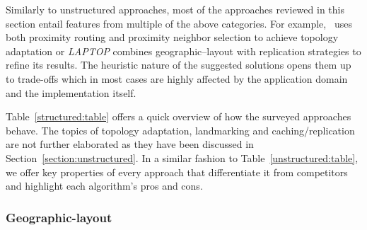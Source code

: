 Similarly to unstructured approaches, most of the approaches 
reviewed in this section entail features from multiple of the above categories. 
For example, \cite{KLKP2008}~uses both proximity routing 
and proximity neighbor selection to achieve topology adaptation 
or \emph{LAPTOP} combines geographic--layout with
replication strategies to refine its results. 
The heuristic nature of the suggested solutions opens them up 
to trade-offs which in most cases are 
highly affected by the application domain and the implementation itself.

Table~\ref{structured:table} offers a quick overview of how the surveyed 
approaches behave.  
The topics of topology adaptation, landmarking and caching/replication
are not further elaborated as they have been discussed 
in Section~\ref{section:unstructured}.
In a similar fashion to Table~\ref{unstructured:table}, we offer 
key properties of every approach 
that differentiate it from competitors and
highlight each algorithm's pros and cons.

\subsubsection{Geographic-layout} \label{section:geographic_layout}


